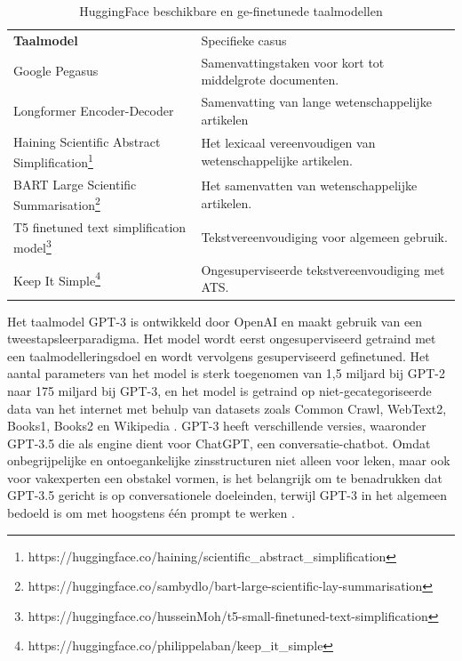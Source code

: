 \begin{center}
	\begin{table}[H]
	\begin{tabular}{ | m{4cm} | m{12cm} | } 
		\hline
		\textbf{Taalmodel} & Specifieke casus \\
		Google Pegasus & Samenvattingstaken voor kort tot middelgrote documenten. \\
		\hline
		Longformer Encoder-Decoder & Samenvatting van lange wetenschappelijke artikelen \\
		\hline
		Haining Scientific Abstract Simplification\footnote{https://huggingface.co/haining/scientific\_abstract\_simplification} & Het lexicaal vereenvoudigen van wetenschappelijke artikelen. \\
		\hline
		BART Large Scientific Summarisation\footnote{https://huggingface.co/sambydlo/bart-large-scientific-lay-summarisation} & Het samenvatten van wetenschappelijke artikelen. \\
		\hline
		T5 finetuned text simplification model\footnote{https://huggingface.co/husseinMoh/t5-small-finetuned-text-simplification} & Tekstvereenvoudiging voor algemeen gebruik. \\
		\hline
		Keep It Simple\footnote{https://huggingface.co/philippelaban/keep\_it\_simple} & Ongesuperviseerde tekstvereenvoudiging met ATS. \\
		\hline
	\end{tabular}
		\caption{HuggingFace beschikbare en ge-finetunede taalmodellen}
		\label{table:huggingface-models}
	\end{table}
\end{center}

\medspace

Het taalmodel GPT-3 is ontwikkeld door OpenAI en maakt gebruik van een tweestapsleerparadigma. Het model wordt eerst ongesuperviseerd getraind met een taalmodelleringsdoel en wordt vervolgens gesuperviseerd gefinetuned. Het aantal parameters van het model is sterk toegenomen van 1,5 miljard bij GPT-2 naar 175 miljard bij GPT-3, en het model is getraind op niet-gecategoriseerde data van het internet met behulp van datasets zoals Common Crawl, WebText2, Books1, Books2 en Wikipedia \autocite{Radford2019, Li2022}. GPT-3 heeft verschillende versies, waaronder GPT-3.5 die als engine dient voor ChatGPT, een conversatie-chatbot. Omdat onbegrijpelijke en ontoegankelijke zinsstructuren niet alleen voor leken, maar ook voor vakexperten een obstakel vormen, is het belangrijk om te benadrukken dat GPT-3.5 gericht is op conversationele doeleinden, terwijl GPT-3 in het algemeen bedoeld is om met hoogstens één prompt te werken \autocite{McNutt2014, Hubbard2017}.

